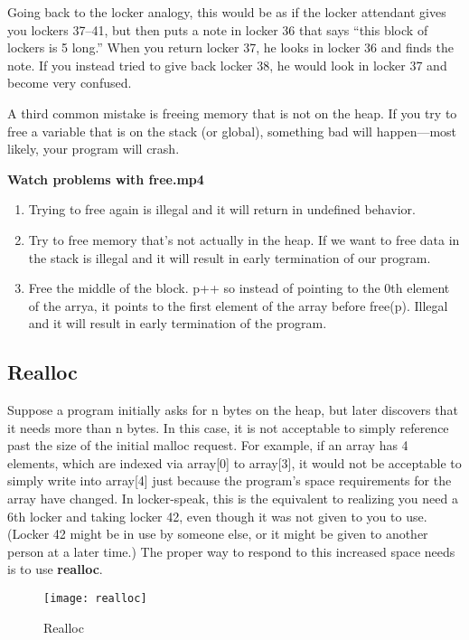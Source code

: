\documentclass[11pt, a4paper]{article}
\begin{document}
Going back to the locker analogy, this would be as if the locker attendant gives you lockers 37–41, but then puts a note in locker 36 that says “this block of lockers is 5 long.” When you return locker 37, he looks in locker 36 and finds the note. If you instead tried to give back locker 38, he would look in locker 37 and become very confused.

A third common mistake is freeing memory that is not on the heap. If you try to free a variable that is on the stack (or global), something bad will happen—most likely, your program will crash.


\textbf{Watch problems with free.mp4}

\begin{enumerate}
  \item Trying to free again is illegal and it will return in undefined behavior.
  \item Try to free memory that's not actually in the heap. If we want to free data in the stack is illegal and it will result in early termination of our program. 
  \item Free the middle of the block. p++ so instead of pointing to the 0th element of the arrya, it points to the first element of the array before free(p). Illegal and it will result in early termination of the program. 
\end{enumerate}


\subsection{Realloc}%
\label{sub:realloc}



Suppose a program initially asks for n bytes on the heap, but later discovers that it needs more than n bytes. In this case, it is not acceptable to simply reference past the size of the initial malloc request. For example, if an array has 4 elements, which are indexed via array[0] to array[3], it would not be acceptable to simply write into array[4] just because the program’s space requirements for the array have changed. In locker-speak, this is the equivalent to realizing you need a 6th locker and taking locker 42, even though it was not given to you to use. (Locker 42 might be in use by someone else, or it might be given to another person at a later time.) The proper way to respond to this increased space needs is to use \textbf{realloc}.



\begin{figure}[htpb]
  \centering
  \texttt{[image: realloc]}
  \caption{Realloc}
  \label{fig:realloc}
\end{figure}
\end{document}
